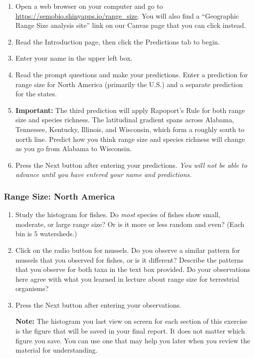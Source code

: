 \documentclass[11pt]{article}
\begin{document}
\begin{enumerate}
	\item Open a web browser on your computer and go to \url{https://semobio.shinyapps.io/range_size}. You will also find a “Geographic Range Size analysis site” link on our Canvas page that you can click instead.
	
	\item Read the Introduction page, then click the Predictions tab to begin. 
	
	\item Enter your name in the upper left box.
	
	\item Read the prompt questions and make your predictions. Enter a prediction for range size
	for North America (primarily the U.S.) and a separate prediction for the states.
	
	\item \textbf{Important:} The third prediction will apply Rapoport's Rule for both range size and 
	species richness. The latitudinal gradient spans across Alabama, Tennessee, Kentucky, Illinois, and
	Wisconsin, which form a roughly south to north line. Predict how you think range size and
	species richness will change as you go from Alabama to Wisconsin.
			
	\item Press the Next button after entering your predictions. \emph{You will not be able to advance until you have entered your name \emph{and} predictions.}
	
\end{enumerate}

\subsubsection*{Range Size: North America}

\begin{enumerate}[resume]
	\item Study the histogram for fishes. Do \emph{most} species of fishes show small, moderate, or
	large range size? Or is it more or less random and even? (Each bin is 5 watersheds.)
	
	\item Click on the radio button for mussels. Do you observe a similar pattern for mussels that
	you observed for fishes, or is it different? Describe the patterns that you observe for both taxa
	in the text box provided. Do your observations here agree with what you learned in lecture about
	range size for terrestrial organisms?
	
	\item Press the Next button after entering your observations.
	
	\textbf{Note:} The histogram you last view on screen for each section of this exercise is the 
	figure that will be saved in your final report. It does not matter which figure you save. You can
	use one that may help you later when you review the material for understanding.
	
\end{enumerate}
\end{document}
